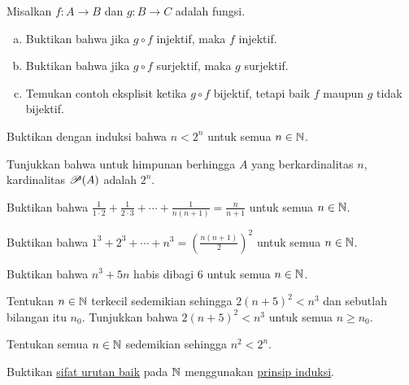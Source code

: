 \begin{exercise}
Misalkan $f \colon A \to B$ dan $g \colon B \to C$ adalah fungsi.
\begin{enumerate}[a)]
\item
Buktikan bahwa jika $g \circ f$ injektif, maka $f$ injektif.
\item
Buktikan bahwa jika $g \circ f$ surjektif, maka $g$ surjektif.
\item
Temukan contoh eksplisit ketika $g \circ f$ bijektif, tetapi baik $f$
maupun $g$ tidak bijektif.
\end{enumerate}
\end{exercise}

\begin{exercise}
\pagebreak[2]
Buktikan dengan induksi bahwa $n < 2^n$ untuk semua $n \in {\mathbb{N}}$.
\end{exercise}

\begin{exercise}
Tunjukkan bahwa untuk himpunan berhingga $A$ yang berkardinalitas $n$,
kardinalitas ${\mathscr{P}}(A)$ adalah $2^n$.
\end{exercise}

\begin{exercise}
Buktikan bahwa $\frac{1}{1\cdot 2} + 
\frac{1}{2\cdot 3} + \cdots + \frac{1}{n(n+1)} = \frac{n}{n+1}$
untuk semua $n \in {\mathbb{N}}$.
\end{exercise}

\begin{exercise}
Buktikan bahwa $1^3 + 2^3 + \cdots + n^3 = {\left( \frac{n(n+1)}{2} \right)}^2$
untuk semua $n \in {\mathbb{N}}$.
\end{exercise}

\begin{exercise}
Buktikan bahwa $n^3 + 5n$ habis dibagi $6$ untuk semua $n \in {\mathbb{N}}$.
\end{exercise}

\begin{exercise}
Tentukan $n \in {\mathbb{N}}$ terkecil sedemikian sehingga $2{(n+5)}^2 < n^3$ dan sebutlah bilangan itu $n_0$.
Tunjukkan bahwa $2{(n+5)}^2 < n^3$ untuk semua $n \geq n_0$.
\end{exercise}

\begin{exercise}
Tentukan semua $n \in {\mathbb{N}}$ sedemikian sehingga $n^2 < 2^n$.
\end{exercise}

\begin{exercise}
Buktikan 
\hyperlink{wop:link}{sifat urutan baik} pada ${\mathbb{N}}$ menggunakan
\hyperref[induction:thm]{prinsip induksi}.
\end{exercise}


